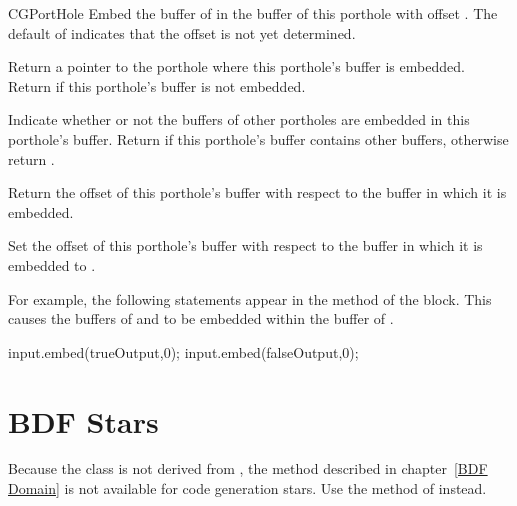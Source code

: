 \begin{indexlist}{CGPortHole}
Embed the buffer of  in the buffer of this porthole with
offset .  The default  of 
indicates that the offset is not yet determined.

\begin{ifhtml}

Return a pointer to the porthole where this porthole's buffer is embedded.
Return  if this porthole's buffer is not embedded.

Indicate whether or not the buffers of other portholes are embedded in this
porthole's buffer.  Return  if this porthole's buffer contains other
buffers, otherwise return .

Return the offset of this porthole's buffer with respect to the buffer in which
it is embedded.

Set the offset of this porthole's buffer with respect to the buffer in which it
is embedded to .

\end{ifhtml}

\end{indexlist}

For example, the following statements appear in the  method
of the  block.  This causes the
buffers of  and  to be embedded within
the buffer of .

\begin{example}
input.embed(trueOutput,0);
input.embed(falseOutput,0);
\end{example}

\section{BDF Stars}
\label{CGC BDF Stars}

Because the class  is not
derived from , the
 method
described in chapter~\ref{BDF Domain} is not available for code
generation stars.  Use the  method of
 instead.

